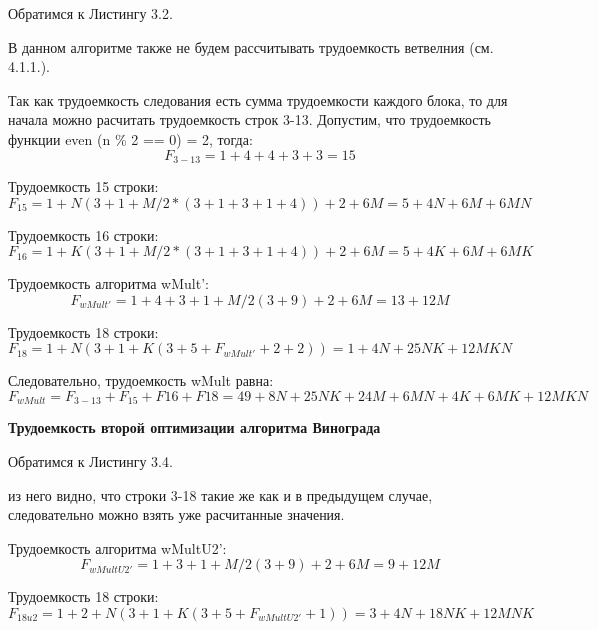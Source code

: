 \documentclass[12pt]{report}
\begin{document}
Обратимся к Листингу 3.2.

В данном алгоритме также не будем рассчитывать трудоемкость ветвелния (см. 4.1.1.).

Так как трудоемкость следования есть сумма трудоемкости каждого блока, то для начала можно расчитать трудоемкость строк 3-13.
Допустим, что трудоемкость функции even (n \% 2 == 0) = 2, тогда:
\begin{equation}
	F_{3-13} = 1 + 4 + 4 + 3 + 3 = 15
\end{equation}

Трудоемкость 15 строки:
\begin{equation}
	F_{15} = 1 + N(3 + 1 + M/2*(3 + 1 + 3 + 1 + 4)) + 2 + 6M = 5 + 4N + 6M + 6MN
\end{equation}

Трудоемкость 16 строки:
\begin{equation}
	F_{16} = 1 + K(3 + 1 + M/2*(3 + 1 + 3 + 1 + 4)) + 2 + 6M = 5 + 4K + 6M + 6MK
\end{equation}

Трудоемкость алгоритма wMult':
\begin{equation}
	F_{wMult'} = 1 + 4 + 3 + 1 + M/2(3 + 9) + 2 + 6M = 13 + 12M
\end{equation}

Трудоемкость 18 строки:
\begin{equation}
	F_{18} = 1 + N(3 + 1 + K(3 + 5 + F_{wMult'} + 2 + 2)) = 1 + 4N + 25NK + 12MKN
\end{equation}

Следовательно, трудоемкость wMult равна:
\begin{equation}
	F_{wMult} = F_{3-13} + F_{15} + F{16} + F{18}  = 49 + 8N + 25NK + 24M + 6MN + 4K + 6MK + 12MKN
\end{equation}

\begin{center}
\textbf{Трудоемкость второй оптимизации алгоритма Винограда}
\end{center}

Обратимся к Листингу 3.4.

из него видно, что строки 3-18 такие же как и в предыдущем случае, следовательно можно взять уже расчитанные значения.

Трудоемкость алгоритма wMultU2':
\begin{equation}
	F_{wMultU2'} = 1 + 3 + 1 + M/2(3 + 9) + 2 + 6M = 9 + 12M
\end{equation}

Трудоемкость 18 строки:
\begin{equation}
	F_{18u2} = 1 + 2 + N(3 + 1 + K(3 + 5 + F_{wMultU2'} + 1)) = 3 + 4N + 18NK + 12MNK
\end{equation}
\end{document}
